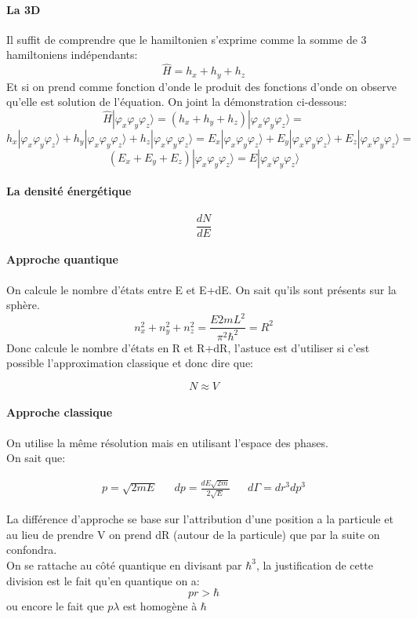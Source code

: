 \paragraph{La 3D}

Il suffit de comprendre que le hamiltonien s'exprime comme la somme de 3 hamiltoniens indépendants:
\[
	\hat{H}=h_x +h_y +h_z
\]
Et si on prend comme fonction d'onde le produit des fonctions d'onde on observe qu'elle est solution de l'équation. On joint la démonstration ci-dessous:
\[
	\hat{H}|\varphi_x \varphi_y \varphi_z\rangle =(h_x +h_y +h_z)|\varphi_x \varphi_y \varphi_z\rangle=
\] 
\[
	h_x|\varphi_x \varphi_y \varphi_z\rangle +h_y|\varphi_x \varphi_y \varphi_z\rangle+h_z|\varphi_x \varphi_y \varphi_z\rangle=E_x|\varphi_x \varphi_y \varphi_z\rangle + E_y|\varphi_x \varphi_y \varphi_z\rangle + E_z|\varphi_x \varphi_y \varphi_z\rangle=
\]
\[
	(E_x +E_y+E_z)|\varphi_x \varphi_y \varphi_z\rangle =E|\varphi_x \varphi_y \varphi_z\rangle
\]

\paragraph{La densité énergétique}

\[
	\frac{dN}{dE}
\]

\paragraph{Approche quantique}

On calcule le nombre d'états entre E et E+dE. On sait qu'ils sont présents sur la sphère.
\[
	n_x^2+n_y^2+n_z^2=\frac{E2mL^2}{\pi^2 \hbar^2}=R^2
\]
Donc calcule le nombre d'états en R et R+dR, l'astuce est d'utiliser si c'est possible l'approximation classique et donc dire que:

\[
	N\approx V
\]


\paragraph{Approche classique}

On utilise la même résolution mais en utilisant l'espace des phases.\\
On sait que:

\begin{align*}
	p=\sqrt{2mE} && dp=\frac{dE\sqrt{2m}}{2\sqrt{E}} && d\Gamma = dr^3dp^3 
\end{align*}

La différence d'approche se base sur l'attribution d'une position a la particule et au lieu de prendre V on prend dR (autour de la particule) que par la suite on confondra.\\
On se rattache au côté quantique en divisant par $\hbar^3$, la justification de cette division est le fait qu'en quantique on a:
\[
	pr>\hbar
\]
ou encore le fait que $p\lambda$ est homogène à $\hbar$